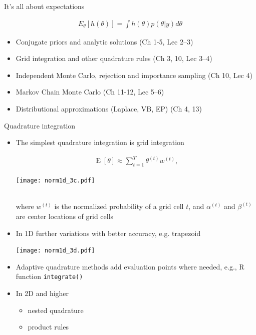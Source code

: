 \documentclass[english,t]{beamer}
\DeclareMathOperator{\E}{E}
\begin{document}
 \begin{frame}
   
  {\Large\color{navyblue} It's all about expectations}

   \begin{align*}
   E_{\theta}[h(\theta)] = \int h(\theta) p(\theta|y) d\theta
   \end{align*}

  \begin{itemize}
  \item Conjugate priors and analytic solutions (Ch 1-5, Lec 2--3)
  \item Grid integration and other quadrature rules (Ch 3, 10, Lec 3--4)
  \item Independent Monte Carlo, rejection and importance sampling (Ch 10, Lec 4)
  \item Markov Chain Monte Carlo (Ch 11-12, Lec 5--6)
  \item {\color{gray}Distributional approximations (Laplace, VB, EP) (Ch 4, 13)}
  \end{itemize}
   

 \end{frame}


\begin{frame}
   
  {\Large\color{navyblue} Quadrature integration}

  \begin{itemize}
  \item The simplest quadrature integration is grid integration\\
    \hspace{0cm}\begin{minipage}{3.5cm}
    \begin{align*}
      \E[\theta] \approx \sum_{t=1}^{T} \theta^{(t)}w^{(t)} ,
    \end{align*}
  \end{minipage}
  \begin{minipage}{6cm}
  \texttt{[image: norm1d\_3c.pdf]}
\end{minipage}\\
where $w^{(t)}$ is the normalized probability of a grid cell $t$, and $\alpha^{(t)}$ and $\beta^{(t)}$ are center locations of grid cells
\item<2-> In 1D further variations with better accuracy, e.g. trapezoid
  \begin{center}
    \texttt{[image: norm1d\_3d.pdf]}
  \end{center}
  \vspace{-0.7\baselineskip}
\item<3-> Adaptive quadrature methods add evaluation points where needed{\color{gray}, e.g., R function \texttt{integrate()}}
\item<4-> In 2D and higher
  \begin{itemize}
  \item nested quadrature
  \item product rules
  \end{itemize}
  \end{itemize}
  

\end{frame}
\end{document}

